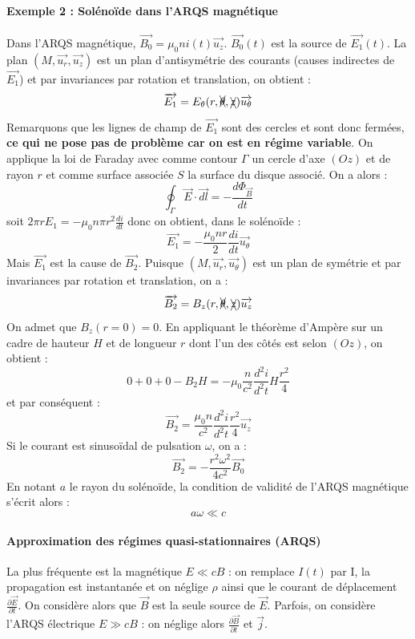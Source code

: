 \documentclass[french]{book}
\theoremstyle{plain}
\theoremstyle{definition}
\theoremstyle{remark}
\begin{document}
\paragraph{Exemple 2 : Solénoïde dans l'ARQS magnétique}
Dans l'ARQS magnétique, $\overrightarrow{B_0}=\mu_0 ni(t)\overrightarrow{u_z}$. $\overrightarrow{B_0}(t)$ est la source de $\overrightarrow{E_1}(t)$. La plan $(M,\overrightarrow{u_r},\overrightarrow{u_z})$ est un plan d'antisymétrie des courants (causes indirectes de $\overrightarrow{E_1}$) et par invariances par rotation et translation, on obtient : $$\overrightarrow{E_1}=E_\theta(r,\xcancel{\theta},\xcancel{z})\overrightarrow{u_\theta}$$
Remarquons que les lignes de champ de $\overrightarrow{E_1}$ sont des cercles et sont donc fermées, \textbf{ce qui ne pose pas de problème car on est en régime variable}. On applique la loi de Faraday avec comme contour $\Gamma$ un cercle d'axe $(Oz)$ et de rayon $r$ et comme surface associée $S$ la surface du disque associé. On a alors : $$\oint_\Gamma\overrightarrow{E}\cdot\overrightarrow{dl}=-\frac{d\Phi_{\overrightarrow{B}}}{dt}$$ soit $\displaystyle 2\pi rE_1=-\mu_0 n\pi r^2\frac{di}{dt}$ donc on obtient, dans le solénoïde : $$\overrightarrow{E_1}=-\frac{\mu_0 nr}{2}\frac{di}{dt}\overrightarrow{u_\theta}$$ Mais $\overrightarrow{E_1}$ est la cause de $\overrightarrow{B_2}$. Puisque $(M,\overrightarrow{u_r},\overrightarrow{u_\theta})$ est un plan de symétrie et par invariances par rotation et translation, on a : $$\overrightarrow{B_2}=B_z(r,\xcancel{\theta},\xcancel{z})\overrightarrow{u_z}$$ On admet que $B_z(r=0)=0$. En appliquant le théorème d'Ampère sur un cadre de hauteur $H$ et de longueur $r$ dont l'un des côtés est selon $(Oz)$, on obtient : $$0+0+0-B_2H=-\mu_0\frac{n}{c^2}\frac{d^2i}{d^2t}H\frac{r^2}{4}$$ et par conséquent : $$\overrightarrow{B_2}=\frac{\mu_0 n}{c^2}\frac{d^2i}{d^2t}\frac{r^2}{4}\overrightarrow{u_z}$$ Si le courant est sinusoïdal de pulsation $\omega$, on a : $$\overrightarrow{B_2}=-\frac{r^2\omega^2}{4c^2}\overrightarrow{B_0}$$ En notant $a$ le rayon du solénoïde, la condition de validité de l'ARQS magnétique s'écrit alors : $$a\omega \ll c$$
\paragraph{Approximation des régimes quasi-stationnaires (ARQS)} La plus fréquente est la magnétique $E\ll cB$ : on remplace $I(t)$ par I, la propagation est instantanée et on néglige $\rho$ ainsi que le courant de déplacement $\displaystyle\frac{\partial \overrightarrow{E}}{\partial t}$. On considère alors que $\overrightarrow{B}$ est la seule source de $\overrightarrow{E}$. Parfois, on considère l'ARQS électrique $E\gg cB$ : on néglige alors $\displaystyle\frac{\partial\overrightarrow{B}}{\partial t}$ et $\overrightarrow{j}$.
\end{document}
